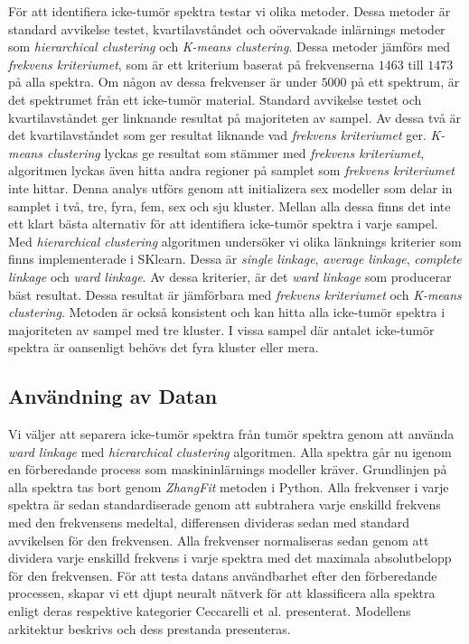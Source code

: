 För att identifiera icke-tumör spektra testar vi olika metoder. Dessa metoder är standard avvikelse testet, kvartilavståndet och oövervakade inlärnings metoder som \textit{hierarchical clustering} och \textit{K-means clustering}. Dessa metoder jämförs med \textit{frekvens kriteriumet}, som är ett kriterium baserat på frekvenserna $1463$ till $1473$ på alla spektra. Om någon av dessa frekvenser är under $5000$ på ett spektrum, är det spektrumet från ett icke-tumör material. Standard avvikelse testet och kvartilavståndet ger linknande resultat på majoriteten av sampel. Av dessa två är det kvartilavståndet som ger resultat liknande vad \textit{frekvens kriteriumet} ger. \textit{K-means clustering} lyckas ge resultat som stämmer med \textit{frekvens kriteriumet}, algoritmen lyckas även hitta andra regioner på samplet som \textit{frekvens kriteriumet} inte hittar. Denna analys utförs genom att initializera sex modeller som delar in samplet i två, tre, fyra, fem, sex och sju kluster. Mellan alla dessa finns det inte ett klart bästa alternativ för att identifiera icke-tumör spektra i varje sampel. Med \textit{hierarchical clustering} algoritmen undersöker vi olika länknings kriterier som finns implementerade i SKlearn. Dessa är \textit{single linkage}, \textit{average linkage}, \textit{complete linkage} och \textit{ward linkage}. Av dessa kriterier, är det \textit{ward linkage} som producerar bäst resultat. Dessa resultat är jämförbara med \textit{frekvens kriteriumet} och \textit{K-means clustering}. Metoden är också konsistent och kan hitta alla icke-tumör spektra i majoriteten av sampel med tre kluster. I vissa sampel där antalet icke-tumör spektra är oansenligt behövs det fyra kluster eller mera.

\subsection*{Användning av Datan}

Vi väljer att separera icke-tumör spektra från tumör spektra genom att använda \textit{ward linkage} med \textit{hierarchical clustering} algoritmen. Alla spektra går nu igenom en förberedande process som maskininlärnings modeller kräver. Grundlinjen på alla spektra tas bort genom \textit{ZhangFit} metoden i Python. Alla frekvenser i varje spektra är sedan standardiserade genom att subtrahera varje enskilld frekvens med den frekvensens medeltal, differensen divideras sedan med standard avvikelsen för den frekvensen. Alla frekvenser normaliseras sedan genom att dividera varje enskilld frekvens i varje spektra med det maximala absolutbelopp för den frekvensen. För att testa datans användbarhet efter den förberedande processen, skapar vi ett djupt neuralt nätverk för att klassificera alla spektra enligt deras respektive kategorier Ceccarelli et al. \cite{cellsubsets} presenterat. Modellens arkitektur beskrivs och dess prestanda presenteras. 

